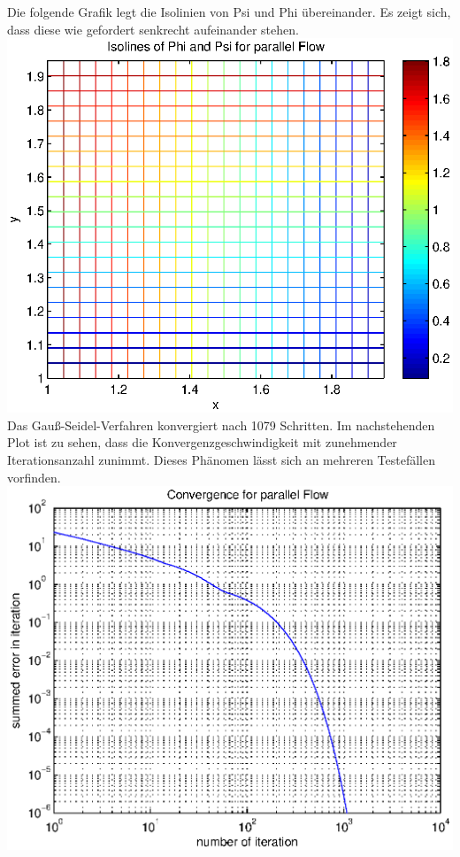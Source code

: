 \documentclass{article}
\begin{document}
Die folgende Grafik legt die Isolinien von Psi und Phi übereinander. Es zeigt sich, dass diese wie
gefordert senkrecht aufeinander stehen.\\ 
\includegraphics[scale=0.6]{test/1parallel/both.eps}\\
Das Gauß-Seidel-Verfahren konvergiert nach 1079 Schritten. Im nachstehenden Plot ist zu sehen, dass die Konvergenzgeschwindigkeit
mit zunehmender Iterationsanzahl zunimmt. Dieses Phänomen lässt sich an mehreren Testefällen vorfinden.\\
\includegraphics[scale=0.7]{test/1parallel/error.eps}
\end{document}
